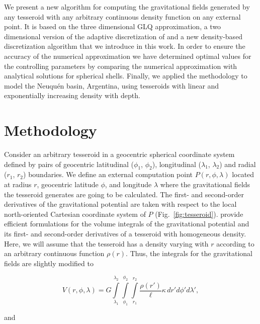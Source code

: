\documentclass[extra, referee]{gji}
\begin{document}
We present a new algorithm for computing the gravitational fields generated by any
tesseroid with any arbitrary continuous density function on any external point.
It is based on the three dimensional GLQ approximation, a two dimensional version of the
adaptive discretization of \citet{Uieda2016} and a new density-based discretization
algorithm that we introduce in this work.
In order to ensure the accuracy of the numerical approximation we have
determined optimal values for the controlling parameters by
comparing the numerical approximation with analytical solutions for
spherical shells.
Finally, we applied the methodology to model the Neuqu\'en basin, Argentina, using
tesseroids with linear and exponentially increasing density with depth.



\section{Methodology}

Consider an arbitrary tesseroid in a geocentric spherical coordinate system defined by
pairs of geocentric latitudinal ($\phi_1$, $\phi_2$), longitudinal ($\lambda_1$,
$\lambda_2$) and radial ($r_1$, $r_2$) boundaries.
We define an external computation point $P(r, \phi, \lambda)$ located at radius $r$,
geocentric latitude $\phi$, and longitude $\lambda$ where the gravitational fields the
tesseroid generates are going to be calculated.
The first- and second-order derivatives of the gravitational potential are taken with
respect to the local north-oriented Cartesian coordinate system of $P$
(Fig.~\ref{fig:tesseroid}).
\citet{Grombein2013} provide efficient formulations for the volume integrals of the
gravitational potential and its first- and second-order derivatives of a tesseroid with
homogeneous density.
Here, we will assume that the tesseroid has a density varying with $r$ according to an
arbitrary continuous function $\rho(r)$.
Thus, the integrals for the gravitational fields are slightly modified to

\begin{equation}
    V(r,\phi,\lambda) = G
    \int\limits_{\lambda_1}^{\lambda_2}
    \int\limits_{\phi_1}^{\phi_2}
    \int\limits_{r_1}^{r_2}
    \frac{\rho(r')}{\ell} \kappa \,  dr' d\phi' d\lambda',
\label{eq:tesseroid-pot}
\end{equation}

\noindent and
\end{document}
